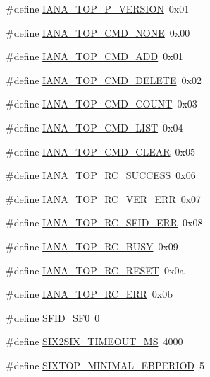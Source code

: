 \begin{DoxyCompactItemize}
\item 
\#define \hyperlink{group__sixtop_ga74014f9a4d1b5540a3e44369e296b449}{I\+A\+N\+A\+\_\+T\+O\+P\+\_\+P\+\_\+\+V\+E\+R\+S\+I\+ON}~0x01
\item 
\#define \hyperlink{group__sixtop_gabdc29537673b19bb583c8ccb3e3330c6}{I\+A\+N\+A\+\_\+T\+O\+P\+\_\+\+C\+M\+D\+\_\+\+N\+O\+NE}~0x00
\item 
\#define \hyperlink{group__sixtop_gaed6611a612519c8be4dcc1b8931ae952}{I\+A\+N\+A\+\_\+T\+O\+P\+\_\+\+C\+M\+D\+\_\+\+A\+DD}~0x01
\item 
\#define \hyperlink{group__sixtop_gadb01974cc07399fc01209c4a94a35eb4}{I\+A\+N\+A\+\_\+T\+O\+P\+\_\+\+C\+M\+D\+\_\+\+D\+E\+L\+E\+TE}~0x02
\item 
\#define \hyperlink{group__sixtop_ga5fc5a89e85fa0537ec21d7c6b4fe5241}{I\+A\+N\+A\+\_\+T\+O\+P\+\_\+\+C\+M\+D\+\_\+\+C\+O\+U\+NT}~0x03
\item 
\#define \hyperlink{group__sixtop_ga9bc18cb88810c338e62221426255d2b5}{I\+A\+N\+A\+\_\+T\+O\+P\+\_\+\+C\+M\+D\+\_\+\+L\+I\+ST}~0x04
\item 
\#define \hyperlink{group__sixtop_ga0bdf7483c22f454cdbaa4b66bb13bd6c}{I\+A\+N\+A\+\_\+T\+O\+P\+\_\+\+C\+M\+D\+\_\+\+C\+L\+E\+AR}~0x05
\item 
\#define \hyperlink{group__sixtop_gaf34161cd672d7fe6175ea1343b31c2bf}{I\+A\+N\+A\+\_\+T\+O\+P\+\_\+\+R\+C\+\_\+\+S\+U\+C\+C\+E\+SS}~0x06
\item 
\#define \hyperlink{group__sixtop_ga92a8bc12446d9440ef6bd92f0bf63b10}{I\+A\+N\+A\+\_\+T\+O\+P\+\_\+\+R\+C\+\_\+\+V\+E\+R\+\_\+\+E\+RR}~0x07
\item 
\#define \hyperlink{group__sixtop_gabb11416715eb01fad87f5e28867c6bd9}{I\+A\+N\+A\+\_\+T\+O\+P\+\_\+\+R\+C\+\_\+\+S\+F\+I\+D\+\_\+\+E\+RR}~0x08
\item 
\#define \hyperlink{group__sixtop_ga08b4fb07b78fd672a46f02e09d24b1a7}{I\+A\+N\+A\+\_\+T\+O\+P\+\_\+\+R\+C\+\_\+\+B\+U\+SY}~0x09
\item 
\#define \hyperlink{group__sixtop_ga5f807240736ea7b4938e6b2087e3e024}{I\+A\+N\+A\+\_\+T\+O\+P\+\_\+\+R\+C\+\_\+\+R\+E\+S\+ET}~0x0a
\item 
\#define \hyperlink{group__sixtop_ga75b866e3a1f1d116a0d61943779a811f}{I\+A\+N\+A\+\_\+T\+O\+P\+\_\+\+R\+C\+\_\+\+E\+RR}~0x0b
\item 
\#define \hyperlink{group__sixtop_ga14969413ec66e507bee020d526feb199}{S\+F\+I\+D\+\_\+\+S\+F0}~0
\item 
\#define \hyperlink{group__sixtop_gafe4b5903cd4d2dd815d7e22c58b9a2e0}{S\+I\+X2\+S\+I\+X\+\_\+\+T\+I\+M\+E\+O\+U\+T\+\_\+\+MS}~4000
\item 
\#define \hyperlink{group__sixtop_ga8280ff28bc5bc0d53db912f80dce4dcd}{S\+I\+X\+T\+O\+P\+\_\+\+M\+I\+N\+I\+M\+A\+L\+\_\+\+E\+B\+P\+E\+R\+I\+OD}~5
\end{DoxyCompactItemize}
